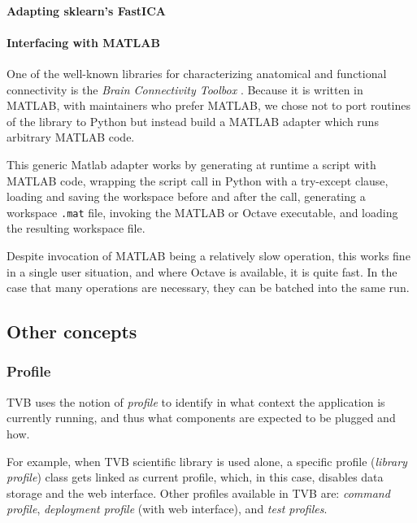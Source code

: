 \paragraph{Adapting sklearn's FastICA}




\paragraph{Interfacing with MATLAB}

One of the well-known libraries for characterizing anatomical 
and functional connectivity is the \emph{Brain Connectivity Toolbox} 
\cite{Rubinov_2010}. 
Because it is written in MATLAB, with maintainers who prefer MATLAB, we 
chose not to port routines of the library to Python but instead build
a MATLAB adapter which runs arbitrary MATLAB code. 

This generic Matlab adapter works by generating at runtime a script with MATLAB code, 
wrapping the script call in Python with a try-except clause,  
loading and saving the workspace before and after the call,
generating a workspace \texttt{.mat} file, invoking the MATLAB or Octave
executable, and loading the resulting workspace file. 

Despite invocation of MATLAB being a relatively slow operation, this works fine in a single
user situation, and where Octave is available, it is quite fast. In the 
case that many operations are necessary, they can be batched into the 
same run.

\subsection{Other concepts}

	\subsubsection{Profile}

TVB uses the notion of \emph{profile} to identify in what context the application is currently running,
and thus what components are expected to be plugged and how.

For example, when TVB scientific library is used alone, a specific profile (\emph{library profile}) class 
gets linked as current profile, which, in this case, disables data storage and the web interface. Other profiles available
in TVB are: \emph{command profile}, \emph{deployment profile} (with web interface), and \emph{test profiles}.

